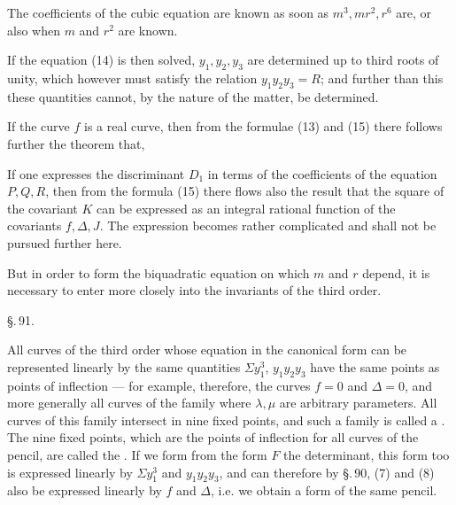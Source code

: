
The coefficients of the cubic equation are known as soon as $m^3, mr^2, r^6$ are, or also when $m$ and $r^2$ are known.

If the equation (14) is then solved, $y_1,y_2,y_3$ are determined up to third roots of unity, which however must satisfy the relation $y_1y_2y_3=R$; and further than this these quantities cannot, by the nature of the matter, be determined.

If the curve $f$ is a real curve, then from the formulae (13) and (15) there follows further the theorem that, 

If one expresses the discriminant $D_1$ in terms of the coefficients of the equation $P,Q,R$, then from the formula (15) there flows also the result that the square of the covariant $K$ can be expressed as an integral rational function of the covariants $f,\Delta,J$. The expression becomes rather complicated and shall not be pursued further here.

But in order to form the biquadratic equation on which $m$ and $r$ depend, it is necessary to enter more closely into the invariants of the third order.

\begin{center}
\S.\,91.

\end{center}

All curves of the third order whose equation in the canonical form can be represented linearly by the same quantities $\Sigma y_1^3$, $y_1y_2y_3$ have the same points as points of inflection — for example, therefore, the curves $f=0$ and $\Delta=0$, and more generally all curves of the family
where $\lambda,\mu$ are arbitrary parameters. All curves of this family intersect in nine fixed points, and such a family is called a . The nine fixed points, which are the points of inflection for all curves of the pencil, are called the . If we form from the form $F$ the  determinant, this form too is expressed linearly by $\Sigma y_1^3$ and $y_1y_2y_3$, and can therefore by \S.\,90, (7) and (8) also be expressed linearly by $f$ and $\Delta$, i.e. we obtain a form of the same pencil.
